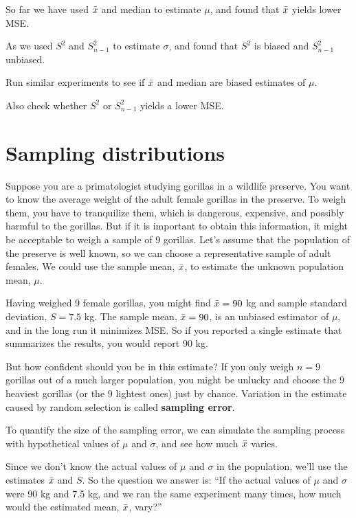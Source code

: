 \documentclass[12pt]{book}
\begin{document}
\begin{exercise}

So far we have used $\bar{x}$ and median to estimate $\mu$, and
found that $\bar{x}$  yields lower MSE.

As we used $S^2$ and $S_{n-1}^2$ to estimate $\sigma$, and found that
$S^2$ is biased and $S_{n-1}^2$ unbiased.

Run similar experiments to see if $\bar{x}$ and median are biased estimates
of $\mu$.

Also check whether $S^2$ or $S_{n-1}^2$ yields a lower MSE.

\end{exercise}


\section{Sampling distributions}

Suppose you are a primatologist studying gorillas in a wildlife
preserve.  You want to know the average weight of the adult
female gorillas in the preserve.  To weigh them, you have
to tranquilize them, which is dangerous, expensive, and possibly
harmful to the gorillas.  But if it is important to obtain this
information, it might be acceptable to weigh a sample of 9
gorillas.  Let's assume that the population of the preserve is
well known, so we can choose a representative sample of adult
females.  We could use the sample mean, $\bar{x}$, to estimate the
unknown population mean, $\mu$.

Having weighed 9 female gorillas, you might find $\bar{x}=90$ kg and
sample standard deviation, $S=7.5$ kg.  The sample mean, $\bar{x}=90$,
is an unbiased estimator of $\mu$, and in the long run it
minimizes MSE.  So if you reported a single
estimate that summarizes the results, you would report 90 kg.

But how confident should you be in this estimate?  If you only weigh
$n=9$ gorillas out of a much larger population, you might be unlucky
and choose the 9 heaviest gorillas (or the 9 lightest ones) just by
chance.  Variation in the estimate caused by random selection is
called {\bf sampling error}.

To quantify the size of the sampling error, we can simulate the
sampling process with hypothetical values of $\mu$ and $\sigma$, and
see how much $\bar{x}$ varies.

Since we don't know the actual values of 
$\mu$ and $\sigma$ in the population, we'll use the estimates
$\bar{x}$ and $S$.
So the question we answer is:
``If the actual values of $\mu$ and $\sigma$ were 90 kg and 7.5 kg,
and we ran the same experiment many times, how much would the
estimated mean, $\bar{x}$, vary?''
\end{document}
